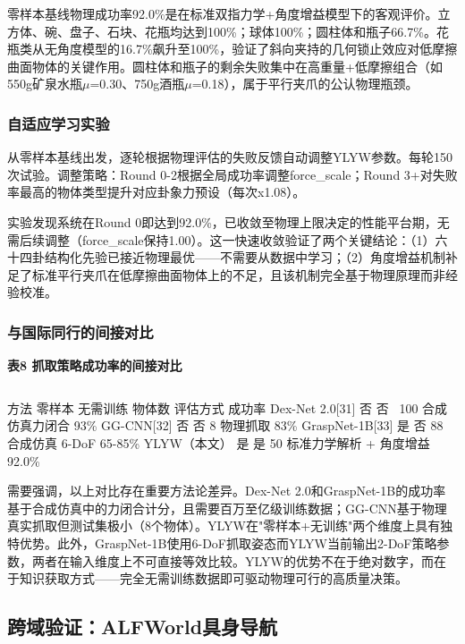 \documentclass[12pt,a4paper]{article}
\begin{document}
零样本基线物理成功率92.0\%是在标准双指力学+角度增益模型下的客观评价。立方体、碗、盘子、石块、花瓶均达到100\%；球体100\%；圆柱体和瓶子66.7\%。花瓶类从无角度模型的16.7\%飙升至100\%，验证了斜向夹持的几何锁止效应对低摩擦曲面物体的关键作用。圆柱体和瓶子的剩余失败集中在高重量+低摩擦组合（如550g矿泉水瓶$\mu$=0.30、750g酒瓶$\mu$=0.18），属于平行夹爪的公认物理瓶颈。
\subsubsection{自适应学习实验}

从零样本基线出发，逐轮根据物理评估的失败反馈自动调整YLYW参数。每轮150次试验。调整策略：Round 0-2根据全局成功率调整force\_scale；Round 3+对失败率最高的物体类型提升对应卦象力预设（每次x1.08）。

实验发现系统在Round 0即达到92.0\%，已收敛至物理上限决定的性能平台期，无需后续调整（force\_scale保持1.00）。这一快速收敛验证了两个关键结论：（1）六十四卦结构化先验已接近物理最优——不需要从数据中学习；（2）角度增益机制补足了标准平行夹爪在低摩擦曲面物体上的不足，且该机制完全基于物理原理而非经验校准。
\subsubsection{与国际同行的间接对比}
\begin{center}
\textbf{表8  抓取策略成功率的间接对比}
\begin{tabular}{lcccc}
\hline
\end{tabular}
\end{center}
方法              零样本  无需训练  物体数  评估方式              成功率
Dex-Net 2.0[31]   否      否        ~100    合成仿真力闭合          93\%
GG-CNN[32]        否      否           8    物理抓取                83\%
GraspNet-1B[33]   是      否          88    合成仿真 6-DoF        65-85\%
YLYW（本文）      是      是          50    标准力学解析 + 角度增益  92.0\%

需要强调，以上对比存在重要方法论差异。Dex-Net 2.0和GraspNet-1B的成功率基于合成仿真中的力闭合计分，且需要百万至亿级训练数据；GG-CNN基于物理真实抓取但测试集极小（8个物体）。YLYW在"零样本+无训练"两个维度上具有独特优势。此外，GraspNet-1B使用6-DoF抓取姿态而YLYW当前输出2-DoF策略参数，两者在输入维度上不可直接等效比较。YLYW的优势不在于绝对数字，而在于知识获取方式——完全无需训练数据即可驱动物理可行的高质量决策。

\subsection{跨域验证：ALFWorld具身导航}
\end{document}
